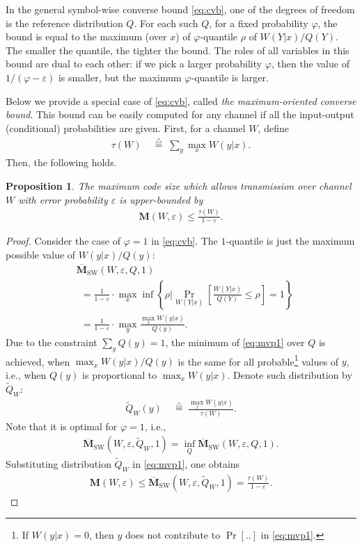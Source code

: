 \documentclass[journal, twocol]{IEEEtran}
\newcommand{\bfM}{{\mathbf{M}}}
\newcommand{\obfM}{{\overline{\mathbf{M}}}}
\newcommand{\tQ}{{\widetilde{Q}}}
\newcommand{\set}[1]{{\left\{{#1}\right\}}}
\newcommand{\brsq}[1]{{\left[{#1}\right]}}
\newcommand{\defeq}{{\overset{\triangle}{=}}}
\newcommand{\ve}{\varepsilon}
\newcommand{\vp}{\varphi}
\newtheorem{proposition}{Proposition}
\begin{document}
In the general symbol-wise converse bound \eqref{eq:cvb}, one of the degrees of freedom is the reference distribution $Q$.
For each such $Q$, for a fixed probability $\vp$, the bound is equal to the maximum (over $x$) of $\vp$-quantile $\rho$ of $W(Y|x)/Q(Y)$.
The smaller the quantile, the tighter the bound.
The roles of all variables in this bound are dual to each other: if we pick a larger probability $\vp$, then the value of $1/(\vp-\ve)$ is smaller, but the maximum $\vp$-quantile is larger.

Below we provide a special case of \eqref{eq:cvb}, called \emph{the maximum-oriented converse bound}.
This bound can be easily computed for any channel if all the input-output (conditional) probabilities are given.
First, for a channel $W$, define
\begin{align}
\tau(W)&\;\defeq\;\sum_y \max_x W(y|x).
\label{eq:tau}
\end{align}
Then, the following holds.

\begin{proposition}
\label{p:mocvb}
The maximum code size which allows transmission over channel $W$ with error probability $\ve$ is upper-bounded by
\begin{align}
\bfM(W, \ve) \leq \frac{\tau(W)}{1-\ve}.
\label{eq:p1w}
\end{align}
\end{proposition}

\begin{proof}
Consider the case of $\vp=1$ in \eqref{eq:cvb}.
The $1$-quantile is just the maximum possible value of $W(y|x)/Q(y)$:
\begin{align}
&\obfM_{\text{SW}}(W,\ve,Q,1) 
\nonumber\\ & \ \ =
 \frac{1}{1 - \ve} \cdot \max_x\inf \set{\rho\bigg| \Pr_{W(Y|x)}\brsq{\frac{W(Y|x)}{Q(Y)}\leq  \rho}= 1}
\nonumber\\ &
\ \ = \frac{1}{1 - \ve} \cdot \max_y \frac{\max_x W(y|x)}{Q(y)}.
\label{eq:mvp1}
\end{align}
Due to the constraint $\sum_y Q(y)=1$, the minimum of \eqref{eq:mvp1} over $Q$ is achieved, when $\max_x W(y|x)/Q(y)$ is the same for all probable\footnote{If $W(y|x)=0$, then $y$ does not contribute to $\Pr[..]$ in \eqref{eq:mvp1}.} values of $y$, i.e., when $Q(y)$ is proportional to $\max_x W(y|x)$.
Denote such distribution by $\tQ_W$: 
{\allowdisplaybreaks
\begin{align}
\tQ_W(y)&\;\defeq\;\frac{\max_x W(y|x)}{\tau(W)}.
\label{eq:tQ}
\end{align}
}%
Note that it is optimal for $\vp=1$, i.e., 
\begin{align}
\obfM_\text{SW}(W,\ve,\tQ_W,1)=\inf_Q\obfM_\text{SW}(W,\ve,Q,1).
\label{eq:tQopt}
\end{align}
Substituting distribution $\tQ_W$ in \eqref{eq:mvp1}, one obtains
\begin{align}
\bfM(W,\ve)\leq \obfM_\text{SW}(W,\ve,\tQ_W,1)=\frac{\tau(W)}{1-\ve}.
\label{eq:cvbs}
\end{align}
\end{proof}
\end{document}
